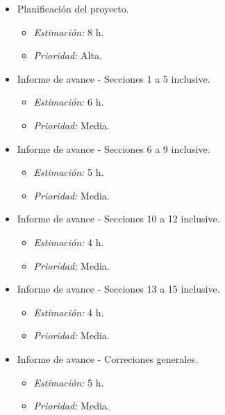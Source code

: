 \documentclass[
11pt, %
]{charter}
\begin{document}
\begin{itemize}
\begin{itemize}
            \item Planificación del proyecto.
                \begin{itemize}
                    \item \textit{Estimación:} 8 h.
                    \item \textit{Prioridad:} Alta.
                \end{itemize}
            \item Informe de avance - Secciones 1 a 5 inclusive.
                \begin{itemize}
                    \item \textit{Estimación:} 6 h.
                    \item \textit{Prioridad:} Media.
                \end{itemize}
            \item Informe de avance - Secciones 6 a 9 inclusive.
                \begin{itemize}
                    \item \textit{Estimación:} 5 h.
                    \item \textit{Prioridad:} Media.
                \end{itemize}
            \item Informe de avance - Secciones 10 a 12 inclusive.
                \begin{itemize}
                    \item \textit{Estimación:} 4 h.
                    \item \textit{Prioridad:} Media.
                \end{itemize}
            \item Informe de avance - Secciones 13 a 15 inclusive.
                \begin{itemize}
                    \item \textit{Estimación:} 4 h.
                    \item \textit{Prioridad:} Media.
                \end{itemize}
            \item Informe de avance - Correciones generales.
                \begin{itemize}
                    \item \textit{Estimación:} 5 h.
                    \item \textit{Prioridad:} Media.
                \end{itemize}
        \end{itemize}   

\end{itemize}
\end{document}
